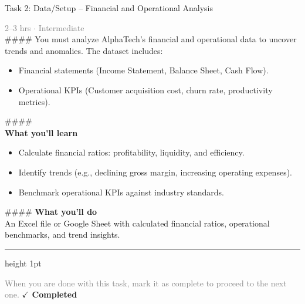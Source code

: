 \documentclass[10pt,a4paper]{article}
\begin{document}
\begin{taskbox}{Task 2: Data/Setup – Financial and Operational Analysis}

    {\small \textcolor{gray}{2--3 hrs $\cdot$ Intermediate}}\\[12pt]

    \#\#\#\#   
You must analyze AlphaTech’s financial and operational data to uncover trends and anomalies. The dataset includes:  
\begin{itemize}
    \item Financial statements (Income Statement, Balance Sheet, Cash Flow).  
    \item Operational KPIs (Customer acquisition cost, churn rate, productivity metrics).  
\end{itemize}

\#\#\#\# \\[10pt]
\vspace{8pt}
{\large \textbf{\textcolor{brandLight}{What you'll learn}}}\\[4pt]  
\begin{itemize}
    \item Calculate financial ratios: profitability, liquidity, and efficiency.  
    \item Identify trends (e.g., declining gross margin, increasing operating expenses).  
    \item Benchmark operational KPIs against industry standards.  
\end{itemize}

\#\#\#\# \vspace{8pt}
{\large \textbf{\textcolor{brandLight}{What you'll do}}}\\[4pt]  
An Excel file or Google Sheet with calculated financial ratios, operational benchmarks, and trend insights.\par

    \vspace{16pt}

    \textcolor{cardBorder}{\hrule height 1pt}\vspace{8pt}

    \small \textcolor{gray}{When you are done with this task, mark it as complete to proceed to the next one.} \hfill \textbf{\textcolor{brandDark}{$\checkmark$ Completed}}

\end{taskbox}
\end{document}
